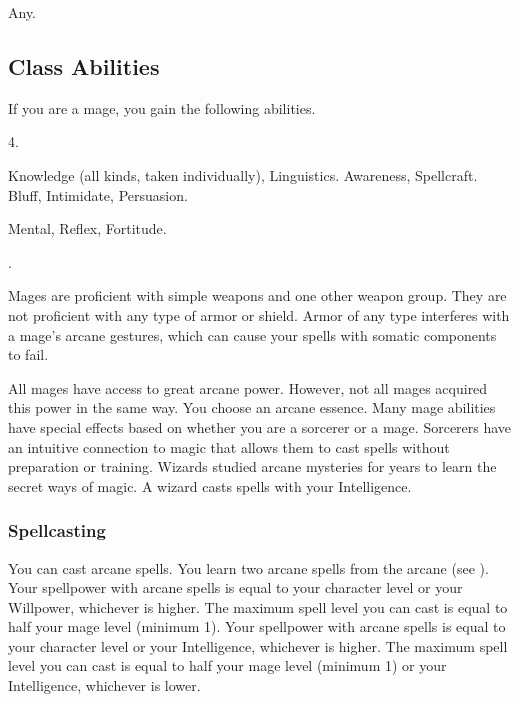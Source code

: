      Any.

    \subsection{Class Abilities}
        If you are a mage, you gain the following abilities.

         4.

         Knowledge (all kinds, taken individually), Linguistics.
         Awareness, Spellcraft.
         Bluff, Intimidate, Persuasion.

          Mental,  Reflex,  Fortitude.

         .

        Mages are proficient with simple weapons and one other weapon group.
        They are not proficient with any type of armor or shield.
        Armor of any type interferes with a mage's arcane gestures, which can cause your spells with somatic components to fail.

        All mages have access to great arcane power.
        However, not all mages acquired this power in the same way.
        You choose an arcane essence.
        Many mage abilities have special effects based on whether you are a sorcerer or a mage.
         Sorcerers have an intuitive connection to magic that allows them to cast spells without preparation or training.
         Wizards studied arcane mysteries for years to learn the secret ways of magic.
        A wizard casts spells with your Intelligence.

        \subsubsection{Spellcasting}

            You can cast arcane spells.
            You learn two arcane spells from the arcane  (see ).
             Your spellpower with arcane spells is equal to your character level or your Willpower, whichever is higher.
            The maximum spell level you can cast is equal to half your mage level (minimum 1).
             Your spellpower with arcane spells is equal to your character level or your Intelligence, whichever is higher.
            The maximum spell level you can cast is equal to half your mage level (minimum 1) or your Intelligence, whichever is lower.

